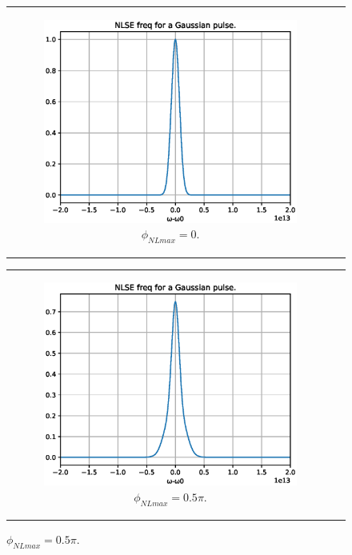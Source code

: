 \begin{figure}[label={fig:spmssfm}, caption={Shape of the spectra for Gaussian pulses by maximum phase shift ($\phi_{NL}$).}]
\begin{tabular}[c]{cc}
\begin{subfigure}[b]{.53\textwidth}
            \includegraphics[width=1\linewidth]{figures/chap3/ssfm_spm/0pi.eps}
            \caption{$\phi_{NLmax}= 0$.}
            \label{fig:spm0pi}
        \end{subfigure}
        \end{tabular}
        \begin{tabular}[c]{cc}
        \begin{subfigure}[b]{.53\textwidth}
		    \centering	
            \includegraphics[width=1\linewidth]{figures/chap3/ssfm_spm/0_5pi.eps}
            \caption{$\phi_{NLmax}= 0.5\pi$.}
            \label{fig:spm05pi}
        \end{subfigure}

\end{tabular}
\end{figure}
